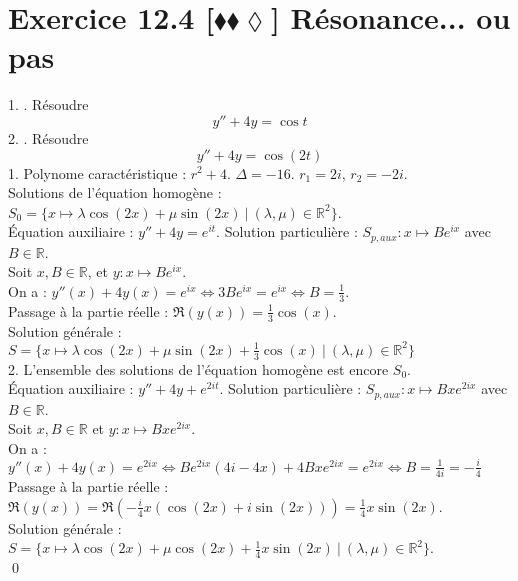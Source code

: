 \documentclass[10pt]{article}
\begin{document}
\section*{Exercice 12.4 [$\blacklozenge\blacklozenge\lozenge$] Résonance... ou pas}
\begin{tcolorbox}[enhanced, width=7.5in, center, size=fbox, fontupper=\large, drop shadow southwest]
    1. . Résoudre
    \begin{equation*}
        y'' + 4y = \cos t
    \end{equation*}
    2. . Résoudre
    \begin{equation*}
        y'' + 4y = \cos(2t)
    \end{equation*}
    1. Polynome caractéristique : $r^2 + 4$. $\Delta=-16$. $r_1 = 2i$, $r_2=-2i$.\\
    Solutions de l'équation homogène : $S_0 = \{x\mapsto \lambda\cos(2x) + \mu\sin(2x) ~ | ~ (\lambda, \mu) \in \mathbb{R}^2\}$.\\
    Équation auxiliaire : $y'' + 4y = e^{it}$. Solution particulière : $S_{p,aux}:x\mapsto Be^{ix}$ avec $B\in\mathbb{R}$.\\
    Soit $x,B\in\mathbb{R}$, et $y:x\mapsto Be^{ix}$.\\
    On a : $y''(x) + 4y(x) = e^{ix} \iff 3Be^{ix} = e^{ix} \iff B = \frac{1}{3}$.\\
    Passage à la partie réelle : $\Re(y(x)) = \frac{1}{3}\cos(x)$.\\
    Solution générale : $S = \{x\mapsto \lambda \cos(2x) + \mu \sin(2x) + \frac{1}{3}\cos(x) ~ | ~ (\lambda, \mu) \in \mathbb{R}^2\}$\\[0.2cm]
    2. L'ensemble des solutions de l'équation homogène est encore $S_0$.\\
    Équation auxiliaire : $y'' + 4y + e^{2it}$. Solution particulière : $S_{p,aux}:x\mapsto Bxe^{2ix}$ avec $B\in\mathbb{R}$.\\
    Soit $x,B\in\mathbb{R}$ et $y:x\mapsto Bxe^{2ix}$.\\
    On a : $y''(x) + 4y(x) = e^{2ix} \iff Be^{2ix}(4i-4x) + 4Bxe^{2ix} = e^{2ix} \iff B=\frac{1}{4i}=-\frac{i}{4}$\\
    Passage à la partie réelle : $\Re(y(x)) = \Re\left( -\frac{i}{4}x(\cos(2x) + i\sin(2x)) \right)=\frac{1}{4}x\sin(2x)$.\\
    Solution générale : $S=\{x\mapsto \lambda\cos(2x) + \mu\cos(2x) + \frac{1}{4}x\sin(2x) ~ | ~ (\lambda, \mu)\in\mathbb{R}^2\}$.\\
    \qed
\end{tcolorbox}
\end{document}
